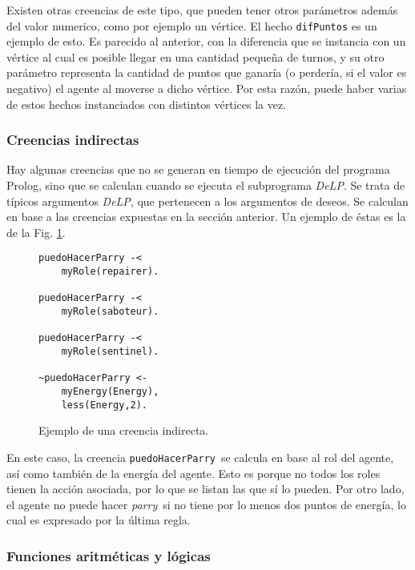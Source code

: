 \documentclass[oneside]{book}
\begin{document}
Existen otras creencias de este tipo, que pueden tener otros parámetros además del valor
numerico, como por ejemplo un vértice. El hecho \texttt{difPuntos} es un ejemplo de esto.
Es parecido al anterior, con la diferencia que se instancia con un vértice al cual es
posible llegar en una cantidad pequeña de turnos, y su otro parámetro representa la
cantidad de puntos que ganaría (o perdería, si el valor es negativo) el agente al moverse
a dicho vértice. Por esta razón, puede haber varias de estos hechos instanciados con
distintos vértices la vez.

\subsubsection{Creencias indirectas}

Hay algunas creencias que no se generan en tiempo de ejecución del programa Prolog, sino
que se calculan cuando se ejecuta el subprograma \textit{DeLP}. Se trata de típicos argumentos
\textit{DeLP}, que pertenecen a los argumentos de deseos. Se calculan en base a las creencias
expuestas en la sección anterior. Un ejemplo de éstas es la de la Fig. 
\ref{fig:creenciaIndirecta}.

\begin{figure}
\begin{verbatim}
puedoHacerParry -<
    myRole(repairer).

puedoHacerParry -<
    myRole(saboteur).

puedoHacerParry -<
    myRole(sentinel).

~puedoHacerParry <-
    myEnergy(Energy),
    less(Energy,2).
\end{verbatim}

\caption{Ejemplo de una creencia indirecta.}
\label{fig:creenciaIndirecta}

\end{figure}

En este caso, la creencia \texttt{puedoHacerParry}\ se calcula en base al rol del 
agente,
así como también de la energía del agente. Esto es porque no todos los roles tienen la
acción asociada, por lo que se listan las que sí lo pueden. Por otro lado, el agente
no puede hacer \textit{parry}\ si no tiene por lo menos dos puntos de energía, lo cual
es expresado por la última regla.

\subsubsection{Funciones aritméticas y lógicas}
\end{document}
